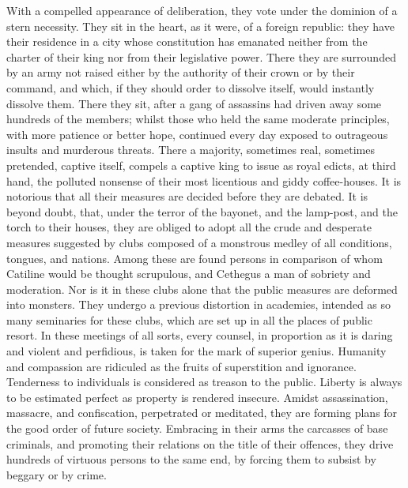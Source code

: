 With a compelled appearance of deliberation, they vote under the dominion of a stern necessity. They sit in the heart, as it were, of a foreign republic: they have their residence in a city whose constitution has emanated neither from the charter of their king nor from their legislative power. There they are surrounded by an army not raised either by the authority of their crown or by their command, and which, if they should order to dissolve itself, would instantly dissolve them. There they sit, after a gang of assassins had driven away some hundreds of the members; whilst those who held the same moderate principles, with more patience or better hope, continued every day exposed to outrageous insults and murderous threats. There a majority, sometimes real, sometimes pretended, captive itself, compels a captive king to issue as royal edicts, at third hand, the polluted nonsense of their most licentious and giddy coffee-houses. It is notorious that all their measures are decided before they are debated. It is beyond doubt, that, under the terror of the bayonet, and the lamp-post, and the torch to their houses, they are obliged to adopt all the crude and desperate measures suggested by clubs composed of a monstrous medley of all conditions, tongues, and nations. Among these are found persons in comparison of whom Catiline would be thought scrupulous, and Cethegus a man of sobriety and moderation. Nor is it in these clubs alone that the public measures are deformed into monsters. They undergo a previous distortion in academies, intended as so many seminaries for these clubs, which are set up in all the places of public resort. In these meetings of all sorts, every counsel, in proportion as it is daring and violent and perfidious, is taken for the mark of superior genius. Humanity and compassion are ridiculed as the fruits of superstition and ignorance. Tenderness to individuals is considered as treason to the public. Liberty is always to be estimated perfect as property is rendered insecure. Amidst assassination, massacre, and confiscation, perpetrated or meditated, they are forming plans for the good order of future society. Embracing in their arms the carcasses of base criminals, and promoting their relations on the title of their offences, they drive hundreds of virtuous persons to the same end, by forcing them to subsist by beggary or by crime.

